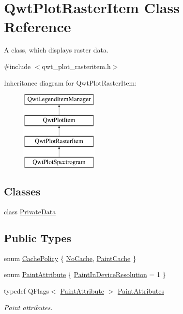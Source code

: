 \hypertarget{class_qwt_plot_raster_item}{\section{Qwt\-Plot\-Raster\-Item Class Reference}
\label{class_qwt_plot_raster_item}
}


A class, which displays raster data.  




{\ttfamily \#include $<$qwt\-\_\-plot\-\_\-rasteritem.\-h$>$}

Inheritance diagram for Qwt\-Plot\-Raster\-Item\-:\begin{figure}[H]
\begin{center}
\leavevmode
\includegraphics[height=4.000000cm]{class_qwt_plot_raster_item}
\end{center}
\end{figure}
\subsection*{Classes}
\begin{DoxyCompactItemize}
\item 
class \hyperlink{class_qwt_plot_raster_item_1_1_private_data}{Private\-Data}
\end{DoxyCompactItemize}
\subsection*{Public Types}
\begin{DoxyCompactItemize}
\item 
enum \hyperlink{class_qwt_plot_raster_item_a94929fc4c31c3dab75ee5adcac2d57b0}{Cache\-Policy} \{ \hyperlink{class_qwt_plot_raster_item_a94929fc4c31c3dab75ee5adcac2d57b0a758ccf247c4ae50d4ffd090ef3a6058e}{No\-Cache}, 
\hyperlink{class_qwt_plot_raster_item_a94929fc4c31c3dab75ee5adcac2d57b0a3bfb74bebbfe1ccabe1d6654fee7c56d}{Paint\-Cache}
 \}
\item 
enum \hyperlink{class_qwt_plot_raster_item_a75ac68ea258b8612e8a1893e845394ee}{Paint\-Attribute} \{ \hyperlink{class_qwt_plot_raster_item_a75ac68ea258b8612e8a1893e845394eea77b139d4d7327465408fe06ec98dbc0d}{Paint\-In\-Device\-Resolution} = 1
 \}
\item 
typedef Q\-Flags$<$ \hyperlink{class_qwt_plot_raster_item_a75ac68ea258b8612e8a1893e845394ee}{Paint\-Attribute} $>$ \hyperlink{class_qwt_plot_raster_item_a6bde441d571c4943da01765dec2d4b4a}{Paint\-Attributes}
\begin{DoxyCompactList}\small\item\em Paint attributes. \end{DoxyCompactList}\end{DoxyCompactItemize}
